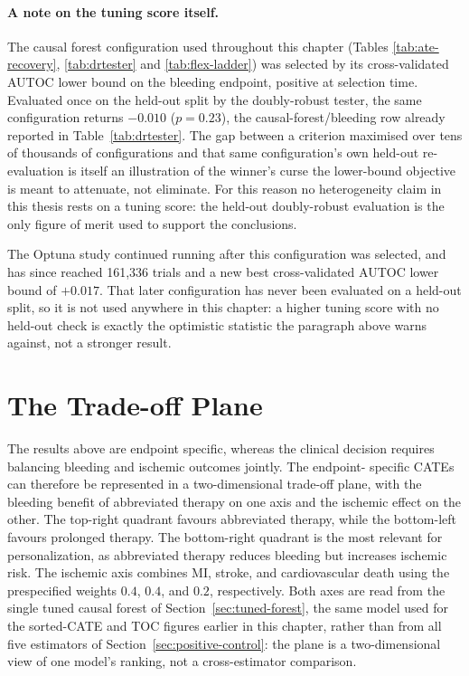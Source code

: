 \paragraph{A note on the tuning score itself.}
The causal forest configuration used throughout this chapter (Tables
\ref{tab:ate-recovery}, \ref{tab:drtester} and \ref{tab:flex-ladder}) was
selected by its cross-validated AUTOC lower bound on the bleeding endpoint,
positive at selection time. Evaluated once on the held-out split by the
doubly-robust tester, the same configuration returns $-0.010$ ($p = 0.23$),
the causal-forest/bleeding row already reported in Table~\ref{tab:drtester}.
The gap between a criterion maximised over tens of thousands of
configurations and that same configuration's own held-out re-evaluation is
itself an illustration of the winner's curse the lower-bound objective is
meant to attenuate, not eliminate. For this reason no heterogeneity claim in
this thesis rests on a tuning score: the held-out doubly-robust evaluation is
the only figure of merit used to support the conclusions.

The Optuna study continued running after this configuration was selected, and
has since reached 161,336 trials and a new best cross-validated AUTOC lower
bound of $+0.017$. That later configuration has never been evaluated on a
held-out split, so it is not used anywhere in this chapter: a higher tuning
score with no held-out check is exactly the optimistic statistic the paragraph
above warns against, not a stronger result.

\section{The Trade-off Plane}
The results above are endpoint specific, whereas the clinical decision
requires balancing bleeding and ischemic outcomes jointly. The endpoint-
specific CATEs can therefore be represented in a two-dimensional trade-off
plane, with the bleeding benefit of abbreviated therapy on one axis and the
ischemic effect on the other. The top-right quadrant favours abbreviated
therapy, while the bottom-left favours prolonged therapy. The bottom-right
quadrant is the most relevant for personalization, as abbreviated therapy
reduces bleeding but increases ischemic risk. The ischemic axis combines MI,
stroke, and cardiovascular death using the prespecified weights $0.4$, $0.4$,
and $0.2$, respectively. Both axes are read from the single tuned causal
forest of Section~\ref{sec:tuned-forest}, the same model used for the
sorted-CATE and TOC figures earlier in this chapter, rather than from all
five estimators of Section~\ref{sec:positive-control}: the plane is a
two-dimensional view of one model's ranking, not a cross-estimator
comparison.

